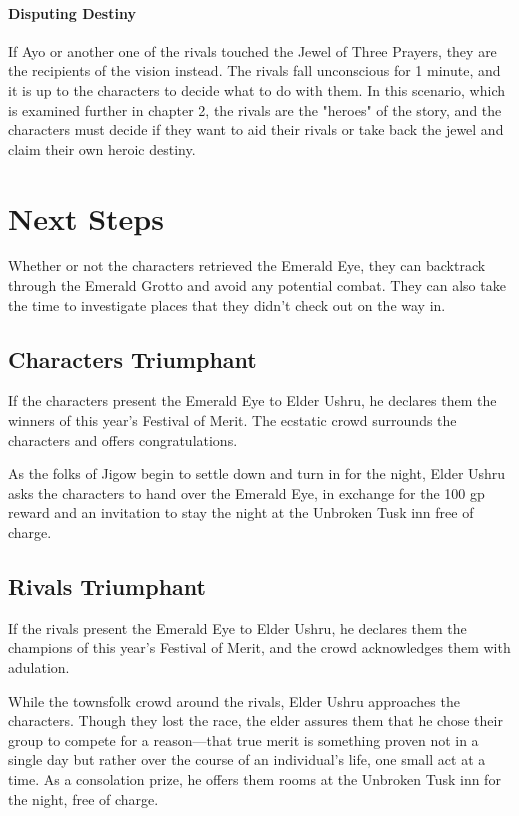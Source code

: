 \documentclass[10pt,a4paper,twoside,twocolumn,openany,nodeprecatedcode]{dndbook}
\begin{document}
\paragraph{Disputing Destiny}
If Ayo or another one of the rivals touched the Jewel of Three Prayers, they are the recipients of the vision instead. The rivals fall unconscious for 1 minute, and it is up to the characters to decide what to do with them. In this scenario, which is examined further in chapter 2, the rivals are the "heroes" of the story, and the characters must decide if they want to aid their rivals or take back the jewel and claim their own heroic destiny.

\section{Next Steps}
Whether or not the characters retrieved the Emerald Eye, they can backtrack through the Emerald Grotto and avoid any potential combat. They can also take the time to investigate places that they didn't check out on the way in.

\subsection{Characters Triumphant}
If the characters present the Emerald Eye to Elder Ushru, he declares them the winners of this year's Festival of Merit. The ecstatic crowd surrounds the characters and offers congratulations.

As the folks of Jigow begin to settle down and turn in for the night, Elder Ushru asks the characters to hand over the Emerald Eye, in exchange for the 100 gp reward and an invitation to stay the night at the Unbroken Tusk inn free of charge.

\subsection{Rivals Triumphant}
If the rivals present the Emerald Eye to Elder Ushru, he declares them the champions of this year's Festival of Merit, and the crowd acknowledges them with adulation.

While the townsfolk crowd around the rivals, Elder Ushru approaches the characters. Though they lost the race, the elder assures them that he chose their group to compete for a reason—that true merit is something proven not in a single day but rather over the course of an individual's life, one small act at a time. As a consolation prize, he offers them rooms at the Unbroken Tusk inn for the night, free of charge.
\end{document}
